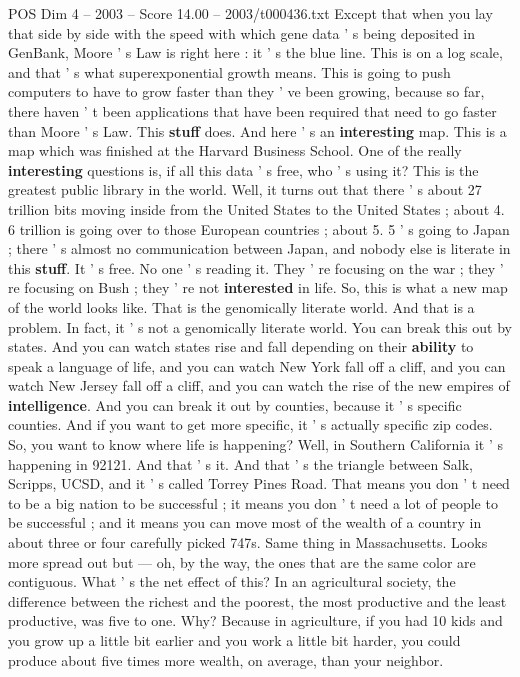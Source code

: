 \begin{textsample}{POS Dim 4 – 2003 – Score 14.00 – 2003/t000436.txt}
Except that when you lay that side by side with the speed with which gene data ' s being deposited in GenBank, Moore ' s Law is right here : it ' s the blue line.
This is on a log scale, and that ' s what superexponential growth means.
This is going to push computers to have to grow faster than they ' ve been growing, because so far, there haven ' t been applications that have been required that need to go faster than Moore ' s Law.
This \textbf{stuff} does.
And here ' s an \textbf{interesting} map.
This is a map which was finished at the Harvard Business School.
One of the really \textbf{interesting} questions is, if all this data ' s free, who ' s using it?
This is the greatest public library in the world.
Well, it turns out that there ' s about 27 trillion bits moving inside from the United States to the United States ; about 4. 6 trillion is going over to those European countries ; about 5. 5 ' s going to Japan ; there ' s almost no communication between Japan, and nobody else is literate in this \textbf{stuff}.
It ' s free.
No one ' s reading it.
They ' re focusing on the war ; they ' re focusing on Bush ; they ' re not \textbf{interested} in life.
So, this is what a new map of the world looks like.
That is the genomically literate world.
And that is a problem.
In fact, it ' s not a genomically literate world.
You can break this out by states.
And you can watch states rise and fall depending on their \textbf{ability} to speak a language of life, and you can watch New York fall off a cliff, and you can watch New Jersey fall off a cliff, and you can watch the rise of the new empires of \textbf{intelligence}.
And you can break it out by counties, because it ' s specific counties.
And if you want to get more specific, it ' s actually specific zip codes.
So, you want to know where life is happening?
Well, in Southern California it ' s happening in 92121.
And that ' s it.
And that ' s the triangle between Salk, Scripps, UCSD, and it ' s called Torrey Pines Road.
That means you don ' t need to be a big nation to be successful ; it means you don ' t need a lot of people to be successful ; and it means you can move most of the wealth of a country in about three or four carefully picked 747s.
Same thing in Massachusetts.
Looks more spread out but — oh, by the way, the ones that are the same color are contiguous.
What ' s the net effect of this?
In an agricultural society, the difference between the richest and the poorest, the most productive and the least productive, was five to one.
Why?
Because in agriculture, if you had 10 kids and you grow up a little bit earlier and you work a little bit harder, you could produce about five times more wealth, on average, than your neighbor.

\end{textsample}
